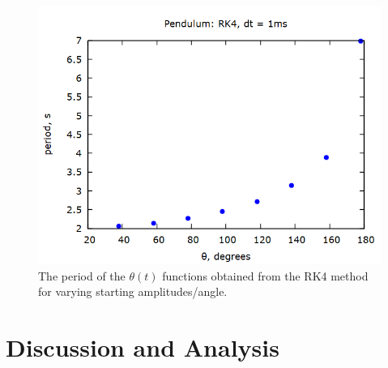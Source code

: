 \documentclass[aps,prl,twocolumn,superscriptaddress]{revtex4-1}
\begin{document}
\begin{figure}[htbp]
  	\begin{center}
 		\includegraphics[scale=0.3]{pendthetavT.png}
  		\caption{The period of the $\theta (t)$ functions obtained from the RK4 method for varying starting amplitudes/angle.}
  		\label{gr:pendthetavT}
 	\end{center}
\end{figure}

\section{Discussion and Analysis}
\end{document}
